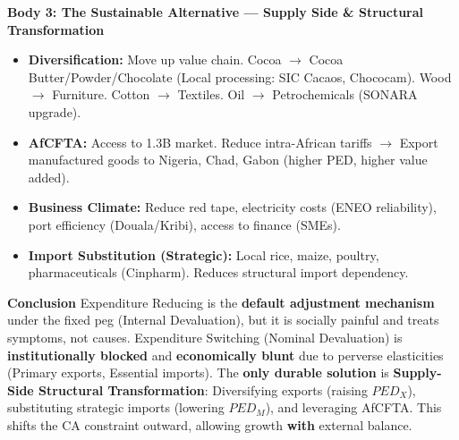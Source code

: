 \documentclass[11pt]{article}
\begin{document}
\begin{exoresolu}
\textbf{Body 3: The Sustainable Alternative — Supply Side \& Structural Transformation}
\begin{itemize}
    \item \textbf{Diversification:} Move up value chain. Cocoa $\rightarrow$ Cocoa Butter/Powder/Chocolate (Local processing: SIC Cacaos, Chococam). Wood $\rightarrow$ Furniture. Cotton $\rightarrow$ Textiles. Oil $\rightarrow$ Petrochemicals (SONARA upgrade).
    \item \textbf{AfCFTA:} Access to 1.3B market. Reduce intra-African tariffs $\rightarrow$ Export manufactured goods to Nigeria, Chad, Gabon (higher PED, higher value added).
    \item \textbf{Business Climate:} Reduce red tape, electricity costs (ENEO reliability), port efficiency (Douala/Kribi), access to finance (SMEs).
    \item \textbf{Import Substitution (Strategic):} Local rice, maize, poultry, pharmaceuticals (Cinpharm). Reduces structural import dependency.
\end{itemize}

\textbf{Conclusion}
Expenditure Reducing is the \textbf{default adjustment mechanism} under the fixed peg (Internal Devaluation), but it is socially painful and treats symptoms, not causes. Expenditure Switching (Nominal Devaluation) is \textbf{institutionally blocked} and \textbf{economically blunt} due to perverse elasticities (Primary exports, Essential imports). The \textbf{only durable solution} is \textbf{Supply-Side Structural Transformation}: Diversifying exports (raising $PED_X$), substituting strategic imports (lowering $PED_M$), and leveraging AfCFTA. This shifts the CA constraint outward, allowing growth \textbf{with} external balance.
\end{exoresolu}
\end{document}
